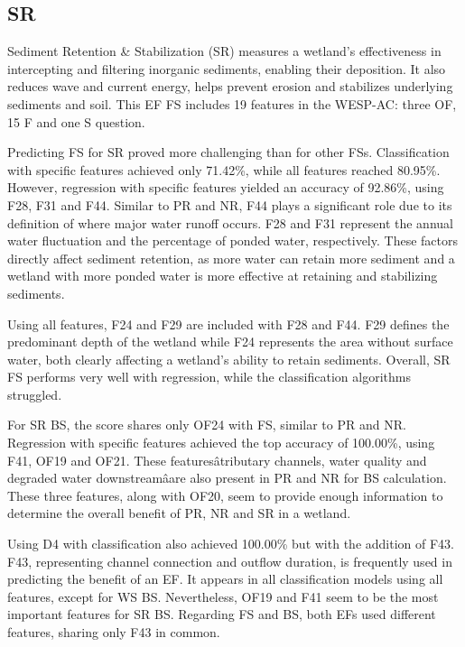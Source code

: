 \documentclass[12pt,letterpaper]{article}
\begin{document}
\subsection{SR}
Sediment Retention \& Stabilization (\ac{SR}) measures a wetland's effectiveness in intercepting and filtering inorganic sediments, enabling their deposition.
It also reduces wave and current energy, helps prevent erosion and stabilizes underlying sediments and soil.
This \ac{EF} \ac{FS} includes 19 features in the \ac{WESP-AC}: three OF, 15 F and one S question.

Predicting \ac{FS} for \ac{SR} proved more challenging than for other \ac{FS}s.
Classification with specific features achieved only 71.42\%, while all features reached 80.95\%.
However, regression with specific features yielded an accuracy of 92.86\%, using F28, F31 and F44.
Similar to \ac{PR} and \ac{NR}, F44 plays a significant role due to its definition of where major water runoff occurs.
F28 and F31 represent the annual water fluctuation and the percentage of ponded water, respectively.
These factors directly affect sediment retention, as more water can retain more sediment and a wetland with more ponded water is more effective at retaining and stabilizing sediments.

Using all features, F24 and F29 are included with F28 and F44.
F29 defines the predominant depth of the wetland while F24 represents the area without surface water, both clearly affecting a wetland's ability to retain sediments.
Overall, \ac{SR} \ac{FS} performs very well with regression, while the classification algorithms struggled.

For \ac{SR} \ac{BS}, the score shares only OF24 with \ac{FS}, similar to \ac{PR} and \ac{NR}.
Regression with specific features achieved the top accuracy of 100.00\%, using F41, OF19 and OF21.
These featuresâtributary channels, water quality and degraded water downstreamâare also present in \ac{PR} and \ac{NR} for \ac{BS} calculation.
These three features, along with OF20, seem to provide enough information to determine the overall benefit of \ac{PR}, \ac{NR} and \ac{SR} in a wetland.

Using D4 with classification also achieved 100.00\% but with the addition of F43.
F43, representing channel connection and outflow duration, is frequently used in predicting the benefit of an \ac{EF}.
It appears in all classification models using all features, except for \ac{WS} \ac{BS}.
Nevertheless, OF19 and F41 seem to be the most important features for \ac{SR} \ac{BS}.
Regarding \ac{FS} and \ac{BS}, both \ac{EF}s used different features, sharing only F43 in common.
\end{document}
